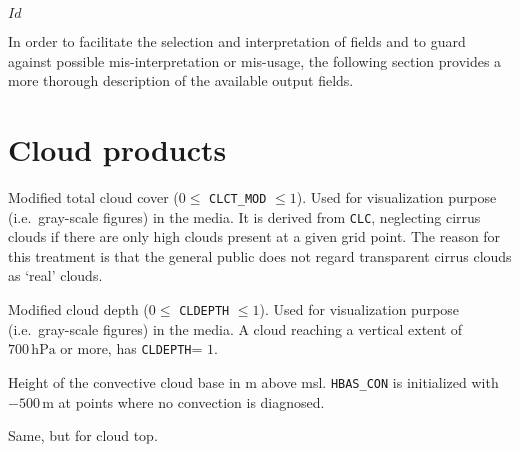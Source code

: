 \svnInfo $Id$


In order to facilitate the selection and interpretation of fields and to guard against possible mis-interpretation or mis-usage, the following section provides a more thorough 
description of the available output fields.




\section{Cloud products}
\begin{description}[leftmargin=3.0cm,style=sameline]
  \item [CLCT\_MOD] Modified total cloud cover ($0 \leq$ \texttt{CLCT\_MOD} $\leq 1$). Used for visualization purpose 
                    (i.e.\ gray-scale figures) in the media. It is derived from \texttt{CLC}, neglecting cirrus clouds if 
                    there are only high clouds present at a given grid point. The reason for this treatment is that 
                    the general public does not regard transparent cirrus clouds as `real' clouds.
  \item [CLDEPTH]   Modified cloud depth ($0 \leq$ \texttt{CLDEPTH} $\leq 1$). Used for visualization purpose (i.e.\ gray-scale figures) 
                    in the media. A cloud reaching a vertical extent of $700\,\mathrm{hPa}$ or more, has \texttt{CLDEPTH}= $1$.
  \item [HBAS\_CON] Height of the convective cloud base in m above msl. \texttt{HBAS\_CON} is initialized with $-500\,\mathrm{m}$ 
                    at points where no convection is diagnosed.
  \item [HTOP\_CON] Same, but for cloud top.
\end{description}



